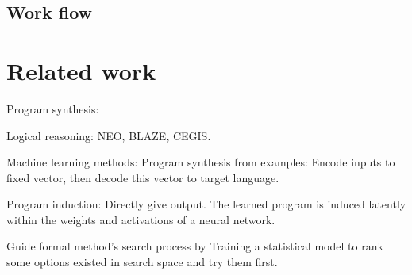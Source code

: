 \documentclass{article}
\begin{document}
\subsection{Work flow}
\section{Related work}
Program synthesis:

Logical reasoning: NEO, BLAZE, CEGIS.

Machine learning methods:
Program synthesis from examples:
Encode inputs to fixed vector, then decode this vector to target language.

Program induction:
Directly give output. The learned program is induced latently within the weights and activations of a neural network.

Guide formal method's search process by Training a statistical model to rank some options existed in search space and try them first.
\end{document}
